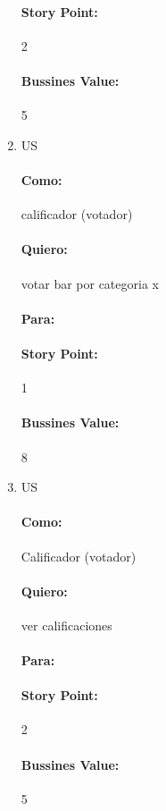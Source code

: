 \begin{enumerate}
\paragraph{Story Point:}2
\paragraph{Bussines Value:} 5


 \item US
\paragraph{Como:} calificador (votador)
\paragraph{Quiero:} votar bar por categoria x
\paragraph{Para:}
\paragraph{Story Point:}1
\paragraph{Bussines Value:} 8


 \item US
\paragraph{Como:} Calificador (votador)
\paragraph{Quiero:}ver calificaciones
\paragraph{Para:}
\paragraph{Story Point:}2
\paragraph{Bussines Value:}5

\end{enumerate}

